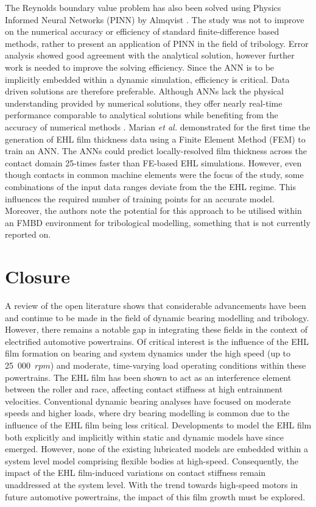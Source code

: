 The Reynolds boundary value problem has also been solved using Physics Informed Neural Networks (PINN) by Almqvist \cite{Almqvist2021}. The study was not to improve on the numerical accuracy or efficiency of standard finite-difference based methods, rather to present an application of PINN in the field of tribology. Error analysis showed good agreement with the analytical solution, however further work is needed to improve the solving efficiency. Since the ANN is to be implicitly embedded within a dynamic simulation, efficiency is critical. Data driven solutions are therefore preferable. Although ANNs lack the physical understanding provided by numerical solutions, they offer nearly real-time performance comparable to analytical solutions while benefiting from the accuracy of numerical methods \cite{EchavarriOtero2014}. Marian \textit{et al.} \cite{Marian2022} demonstrated for the first time the generation of EHL film thickness data using a Finite Element Method (FEM) to train an ANN. The ANNs could predict locally-resolved film thickness across the contact domain 25-times faster than FE-based EHL simulations. However, even though contacts in common machine elements were the focus of the study, some combinations of the input data ranges deviate from the the EHL regime. This influences the required number of training points for an accurate model. Moreover, the authors note the potential for this approach to be utilised within an FMBD environment for tribological modelling, something that is not currently reported on.


\section{Closure}
A review of the open literature shows that considerable advancements have been and continue to be made in the field of dynamic bearing modelling and tribology. However, there remains a notable gap in integrating these fields in the context of electrified automotive powertrains. Of critical interest is the influence of the EHL film formation on bearing and system dynamics under the high speed (up to 25~000~$rpm$) and moderate, time-varying load operating conditions within these powertrains. The EHL film has been shown to act as an interference element between the roller and race, affecting contact stiffness at high entrainment velocities. Conventional dynamic bearing analyses have focused on moderate speeds and higher loads, where dry bearing modelling is common due to the influence of the EHL film being less critical. Developments to model the EHL film both explicitly and implicitly within static and dynamic models have since emerged. However, none of the existing lubricated models are embedded within a system level model comprising flexible bodies at high-speed. Consequently, the impact of the EHL film-induced variations on contact stiffness remain unaddressed at the system level. With the trend towards high-speed motors in future automotive powertrains, the impact of this film growth must be explored.

